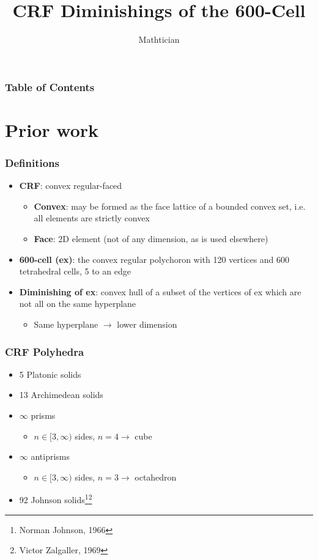 \documentclass{beamer}
\begin{document}
\title{CRF Diminishings of the 600-Cell}
\author{Mathtician}
\maketitle

\begin{frame}
  \frametitle{Table of Contents}
  \tableofcontents
\end{frame}

\section{Prior work}

\begin{frame}
  \frametitle{Definitions}
  \begin{itemize}
  \item
    \textbf{CRF}: convex regular-faced
    \begin{itemize}
    \item
      \textbf{Convex}: may be formed as the face lattice of a bounded convex set,
      i.e. all elements are strictly convex
    \item
      \textbf{Face}: 2D element (not of any dimension, as is used elsewhere)
    \end{itemize}
  \item
    \textbf{600-cell (ex)}:
    the convex regular polychoron with 120 vertices
    and 600 tetrahedral cells, 5 to an edge
  \item
    \textbf{Diminishing of ex}:
    convex hull of a subset of the vertices of ex
    which are not all on the same hyperplane
    \begin{itemize}
    \item
      Same hyperplane $\rightarrow$ lower dimension
    \end{itemize}
  \end{itemize}
\end{frame}

\begin{frame}
  \frametitle{CRF Polyhedra}
  \begin{itemize}
  \item
    5 Platonic solids
  \item
    13 Archimedean solids
  \item
    $\infty$ prisms
    \begin{itemize}
    \item
      $n \in [3, \infty)$ sides, $n = 4 \rightarrow$ cube
    \end{itemize}
  \item
    $\infty$ antiprisms
    \begin{itemize}
    \item
      $n \in [3, \infty)$ sides, $n = 3 \rightarrow$ octahedron
    \end{itemize}
  \item
    92 Johnson solids\footnote{Norman Johnson, 1966}\footnote{Victor Zalgaller, 1969}
  \end{itemize}
\end{frame}
\end{document}
